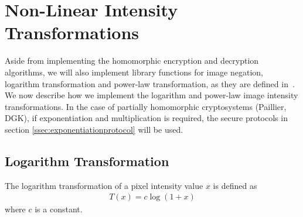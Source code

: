 
\section{Non-Linear Intensity Transformations}
Aside from implementing the homomorphic encryption and decryption algorithms, we will also implement library functions for image negation, logarithm transformation and power-law transformation, as they are defined in~\cite{gonzalez_digital_2008}.
We now describe how we implement the logarithm and power-law image intensity transformations. In the case of partially homomorphic cryptosystems (Paillier, DGK), if  exponentiation and multiplication is required, the secure protocols in section \ref{ssec:exponentiationprotocol} will be used.

\subsection{Logarithm Transformation}
The logarithm transformation of a pixel intensity value $x$ is defined as
\begin{align}
	T\left(x\right) = c \log\left(1 + x\right)
\end{align}
where $c$ is a constant.

